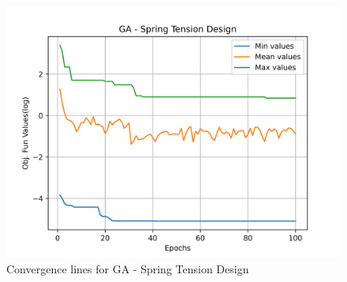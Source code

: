 \begin{figure}[H]
\centering
\caption{Convergence lines for GA - Spring Tension Design}
\label{fig:spring_problem_solve_ga}
\includegraphics[scale=0.5]{images/spring_problem_solve_ga.png}
\end{figure}
        